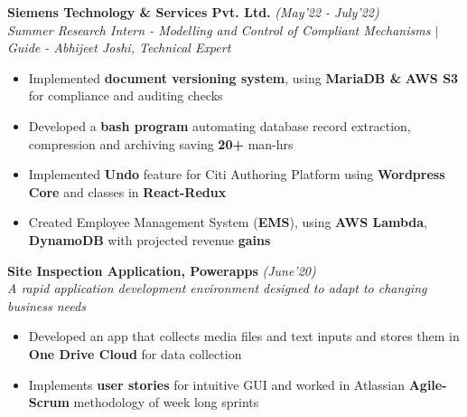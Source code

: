 \documentclass[10.5pt]{article}
\begin{document}
    \vspace{0pt}
  \textbf{\large Siemens Technology \& Services Pvt. Ltd.} \hfill{\sl\small(May'22 - July'22)}\\
  \textit{Summer Research Intern - Modelling and Control of Compliant Mechanisms $|$ Guide - Abhijeet Joshi, Technical Expert}
  \begin{itemize}[itemsep=-1.5mm, leftmargin=*]
  \vspace{-5pt}
      \item Implemented \textbf{document versioning system}, using \textbf{MariaDB \&} \textbf{AWS S3} for compliance and auditing checks 
      
      \item Developed a \textbf{bash program} automating database record extraction, compression and archiving saving \textbf{20+} man-hrs 
     
      \item Implemented \textbf{Undo} feature for Citi Authoring Platform using \textbf{Wordpress Core} and classes in \textbf{React-Redux}
     
      \item Created Employee Management System (\textbf{EMS}), using \textbf{AWS  Lambda}, \textbf{DynamoDB} with projected revenue \textbf{gains}
  \end{itemize}

 \vspace{-3pt}
  \hspace{-18 pt}
  \textbf{\large Site Inspection Application, Powerapps} \hfill{\sl\small (June'20)}\\
  \vspace{-6pt}
  \hspace{-7pt}
  \textit{A rapid application development environment designed to adapt to changing business needs}
  \begin{itemize}[itemsep = -1.5 mm, leftmargin=*]
    \item Developed an app that collects media files and text inputs and stores them in \textbf{One Drive Cloud} for data collection
    
    \item Implements \textbf{user stories} for intuitive GUI and worked in Atlassian \textbf{Agile-Scrum} methodology of week long sprints 
  \end{itemize}
\end{document}
